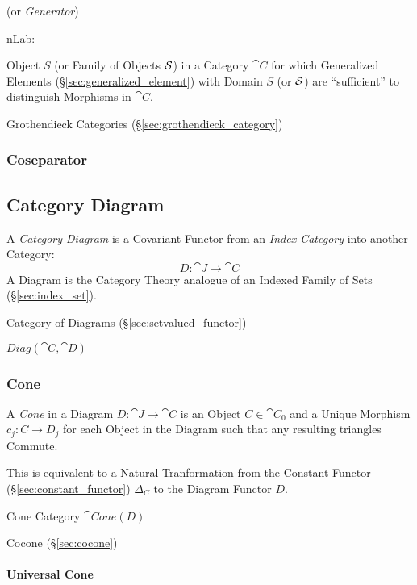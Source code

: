 (or \emph{Generator})

nLab:

Object $S$ (or Family of Objects $\mathcal{S}$) in a Category $\cat{C}$
for which Generalized Elements (\S\ref{sec:generalized_element}) with
Domain $S$ (or $\mathcal{S}$) are ``sufficient'' to distinguish
Morphisms in $\cat{C}$.

Grothendieck Categories (\S\ref{sec:grothendieck_category})



\subsubsection{Coseparator}\label{sec:coseparator}



\subsection{Category Diagram}\label{sec:category_diagram}

A \emph{Category Diagram} is a Covariant Functor from an \emph{Index
  Category} into another Category:
\[
  D : \cat{J} \rightarrow \cat{C}
\]
A Diagram is the Category Theory analogue of an Indexed Family of Sets
(\S\ref{sec:index_set}).

Category of Diagrams (\S\ref{sec:setvalued_functor})

$Diag(\cat{C},\cat{D})$



\subsubsection{Cone}\label{sec:category_cone}

A \emph{Cone} in a Diagram $D : \cat{J} \rightarrow \cat{C}$ is
an Object $C \in \cat{C}_0$ and a Unique Morphism $c_j : C
\rightarrow D_j$ for each Object in the Diagram such that any
resulting triangles Commute.

This is equivalent to a Natural Tranformation from the Constant
Functor (\S\ref{sec:constant_functor}) $\Delta_C$ to the Diagram
Functor $D$.

Cone Category $\cat{Cone}(D)$

Cocone (\S\ref{sec:cocone})



\paragraph{Universal Cone}\label{sec:universal_cone}
\hfill \\

